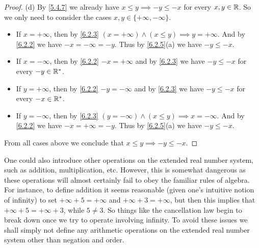 \begin{proof}{(d)}
  By \cref{5.4.7} we already have \(x \leq y \implies -y \leq -x\) for every \(x, y \in \mathbb{R}\).
  So we only need to consider the cases \(x, y \in \{+\infty, -\infty\}\).
  \begin{itemize}
    \item If \(x = +\infty\), then by \cref{6.2.3} \((x = +\infty) \land (x \leq y) \implies y = +\infty\).
          And by \cref{6.2.2} we have \(-x = -\infty = -y\).
          Thus by \cref{6.2.5}(a) we have \(-y \leq -x\).
    \item If \(x = -\infty\), then by \cref{6.2.2} \(-x = +\infty\) and by \cref{6.2.3} we have \(-y \leq -x\) for every \(-y \in \mathbb{R}^*\).
    \item If \(y = +\infty\), then by \cref{6.2.2} \(-y = -\infty\) and by \cref{6.2.3} we have \(-y \leq -x\) for every \(-x \in \mathbb{R}^*\).
    \item If \(y = -\infty\), then by \cref{6.2.3} \((y = -\infty) \land (x \leq y) \implies x = -\infty\).
          And by \cref{6.2.2} we have \(-x = +\infty = -y\).
          Thus by \cref{6.2.5}(a) we have \(-y \leq -x\).
  \end{itemize}
  From all cases above we conclude that \(x \leq y \implies -y \leq -x\).
\end{proof}

\begin{note}
  One could also introduce other operations on the extended real number system, such as addition, multiplication, etc.
  However, this is somewhat dangerous as these operations will almost certainly fail to obey the familiar rules of algebra.
  For instance, to define addition it seems reasonable (given one's intuitive notion of infinity) to set \(+\infty + 5 = +\infty\) and \(+\infty + 3 = +\infty\), but then this implies that \(+\infty + 5 = +\infty + 3\), while \(5 \neq 3\).
  So things like the cancellation law begin to break down once we try to operate involving infinity.
  To avoid these issues we shall simply not define any arithmetic operations on the extended real number system other than negation and order.
\end{note}

